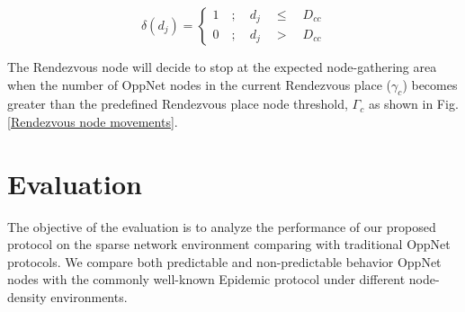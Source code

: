 \documentclass[conference]{IEEEtran}
\begin{document}
\[\delta \left( { d }_{ j } \right) =\begin{cases} 1\quad ;\quad { d }_{ j }\quad \le { \quad D }_{ cc } \\ 0\quad ;\quad { d }_{ j }\quad >{ \quad D }_{ cc } \end{cases}  \] 

The Rendezvous node will decide to stop at the expected node-gathering area when the number of OppNet nodes in the current Rendezvous place ($\gamma_{c}$) becomes greater than the predefined Rendezvous place node threshold, $\Gamma_{c}$ as shown in Fig. \ref{Rendezvous node movements}.  

\section{Evaluation}
The objective of the evaluation is to analyze the performance of our proposed protocol on the sparse network environment comparing with traditional OppNet protocols.
%
We compare both predictable and non-predictable behavior OppNet nodes with the commonly well-known Epidemic protocol\cite{Vahdat2000} under different node-density environments.

\end{document}
